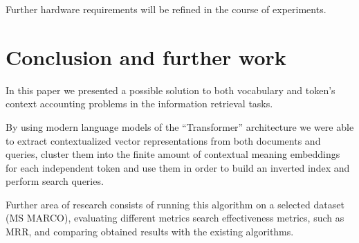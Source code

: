 \documentclass[
    twocolumn,
]{template/ceurart}
\begin{document}
    Further hardware requirements will be refined in the course of experiments.


    \section{Conclusion and further work}

    In this paper we presented a possible solution to both vocabulary and token's context accounting problems in
    the information retrieval tasks.

    By using modern language models of the ``Transformer'' architecture we were able to extract contextualized vector
    representations from both documents and queries, cluster them into the finite amount of contextual meaning
    embeddings for each independent token
    and use them in order to build an inverted index and perform search queries.

    Further area of research consists of running this algorithm on a selected dataset (MS MARCO),
    evaluating different metrics search effectiveness metrics, such as MRR, and comparing obtained results with the
    existing algorithms.


    
\end{document}
